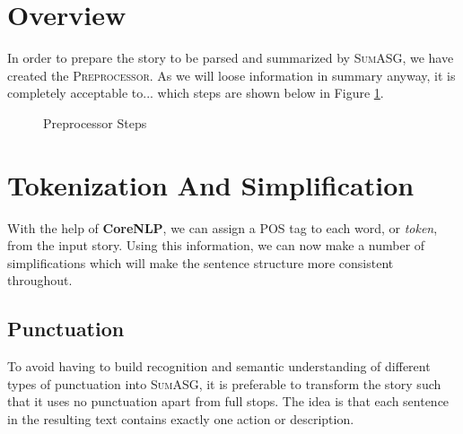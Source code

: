 \label{chapter:preprocessor}

\section{Overview}

In order to prepare the story to be parsed and summarized by \textsc{SumASG}, we have created the \textsc{Preprocessor}. As we will loose information in summary anyway, it is completely acceptable to... which steps are shown below in Figure \ref{fig:preprocessor_pipeline}.

\begin{figure}[H]
\centering
{}
\caption{Preprocessor Steps}
\label{fig:preprocessor_pipeline}
\end{figure}

\section{Tokenization And Simplification}
\label{sec:tokenization_scoring}

With the help of \textbf{CoreNLP}, we can assign a POS tag to each word, or \textit{token}, from the input story. Using this information, we can now make a number of simplifications which will make the sentence structure more consistent throughout.

\subsection{Punctuation}
\label{subsec:punctuation}

To avoid having to build recognition and semantic understanding of different types of punctuation into \textsc{SumASG}, it is preferable to transform the story such that it uses no punctuation apart from full stops. The idea is that each sentence in the resulting text contains exactly one action or description.

